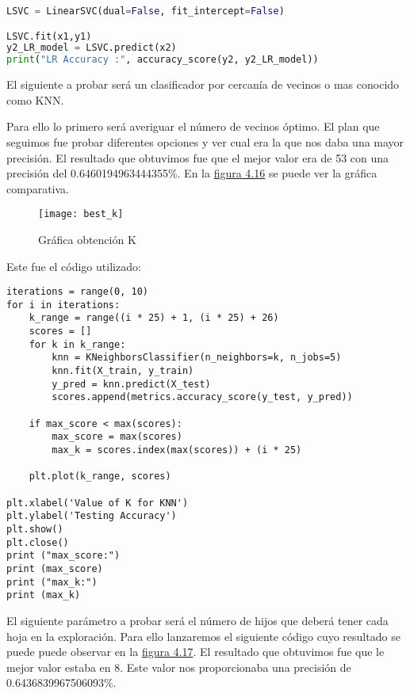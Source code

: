 \begin{lstlisting}[language=python]
LSVC = LinearSVC(dual=False, fit_intercept=False)

LSVC.fit(x1,y1)
y2_LR_model = LSVC.predict(x2)
print("LR Accuracy :", accuracy_score(y2, y2_LR_model))
\end{lstlisting}

El siguiente a probar será un clasificador por cercanía de vecinos o mas conocido como KNN.

Para ello lo primero será averiguar el número de vecinos óptimo. El plan que seguimos
fue probar diferentes opciones y ver cual era la que nos daba una mayor precisión. El resultado
que obtuvimos fue que el mejor valor era de 53 con una precisión del 0.6460194963444355\%.
En la \hyperref[fig:Gráfica obtención K]{figura 4.16} se puede ver la gráfica comparativa.

\begin{figure}[htb]
  \centering
    \texttt{[image: best\_k]}
  \caption[Gráfica obtención K]{Gráfica obtención K}
  \label{fig:Gráfica obtención K}
\end{figure}

Este fue el código utilizado:

\begin{lstlisting}
iterations = range(0, 10)
for i in iterations:
    k_range = range((i * 25) + 1, (i * 25) + 26)
    scores = []
    for k in k_range:
        knn = KNeighborsClassifier(n_neighbors=k, n_jobs=5)
        knn.fit(X_train, y_train)
        y_pred = knn.predict(X_test)
        scores.append(metrics.accuracy_score(y_test, y_pred))

    if max_score < max(scores):
        max_score = max(scores)
        max_k = scores.index(max(scores)) + (i * 25)

    plt.plot(k_range, scores)

plt.xlabel('Value of K for KNN')
plt.ylabel('Testing Accuracy')
plt.show()
plt.close()
print ("max_score:")
print (max_score)
print ("max_k:")
print (max_k)
\end{lstlisting}

El siguiente parámetro a probar será el número de hijos que deberá tener
cada hoja en la exploración. Para ello lanzaremos el siguiente código cuyo
resultado se puede puede observar en la \hyperref[fig:Gráfica obtención leaf size]{figura 4.17}. El resultado que obtuvimos
fue que le mejor valor estaba en 8. Este valor nos proporcionaba una precisión
de 0.6436839967506093\%. 

